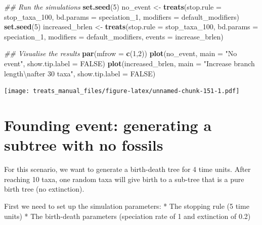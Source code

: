 \documentclass[
]{book}
\newenvironment{Shaded}{\begin{snugshade}}{\end{snugshade}}
\newcommand{\CharTok}[1]{\textcolor[rgb]{0.31,0.60,0.02}{#1}}
\newcommand{\CommentTok}[1]{\textcolor[rgb]{0.56,0.35,0.01}{\textit{#1}}}
\newcommand{\DataTypeTok}[1]{\textcolor[rgb]{0.13,0.29,0.53}{#1}}
\newcommand{\DecValTok}[1]{\textcolor[rgb]{0.00,0.00,0.81}{#1}}
\newcommand{\KeywordTok}[1]{\textcolor[rgb]{0.13,0.29,0.53}{\textbf{#1}}}
\newcommand{\NormalTok}[1]{#1}
\newcommand{\OtherTok}[1]{\textcolor[rgb]{0.56,0.35,0.01}{#1}}
\newcommand{\StringTok}[1]{\textcolor[rgb]{0.31,0.60,0.02}{#1}}
\begin{document}
\begin{Shaded}
\begin{Highlighting}[]
\CommentTok{\#\# Run the simulations}
\KeywordTok{set.seed}\NormalTok{(}\DecValTok{5}\NormalTok{)}
\NormalTok{no\_event \textless{}{-}}\StringTok{ }\KeywordTok{treats}\NormalTok{(}\DataTypeTok{stop.rule =}\NormalTok{ stop\_taxa\_}\DecValTok{100}\NormalTok{,}
                 \DataTypeTok{bd.params =}\NormalTok{ speciation\_}\DecValTok{1}\NormalTok{,}
                 \DataTypeTok{modifiers =}\NormalTok{ default\_modifiers)}
\KeywordTok{set.seed}\NormalTok{(}\DecValTok{5}\NormalTok{)}
\NormalTok{increased\_brlen \textless{}{-}}\StringTok{ }\KeywordTok{treats}\NormalTok{(}\DataTypeTok{stop.rule =}\NormalTok{ stop\_taxa\_}\DecValTok{100}\NormalTok{,}
                        \DataTypeTok{bd.params =}\NormalTok{ speciation\_}\DecValTok{1}\NormalTok{,}
                        \DataTypeTok{modifiers =}\NormalTok{ default\_modifiers,}
                        \DataTypeTok{events =}\NormalTok{ increase\_brlen)}

\CommentTok{\#\# Visualise the results}
\KeywordTok{par}\NormalTok{(}\DataTypeTok{mfrow =} \KeywordTok{c}\NormalTok{(}\DecValTok{1}\NormalTok{,}\DecValTok{2}\NormalTok{))}
\KeywordTok{plot}\NormalTok{(no\_event, }\DataTypeTok{main =} \StringTok{"No event"}\NormalTok{, }\DataTypeTok{show.tip.label =} \OtherTok{FALSE}\NormalTok{)}
\KeywordTok{plot}\NormalTok{(increased\_brlen, }\DataTypeTok{main =} \StringTok{"Increase branch length}\CharTok{\textbackslash{}n}\StringTok{after 30 taxa"}\NormalTok{,}
    \DataTypeTok{show.tip.label =} \OtherTok{FALSE}\NormalTok{)}
\end{Highlighting}
\end{Shaded}

\texttt{[image: treats\_manual\_files/figure-latex/unnamed-chunk-151-1.pdf]}

\hypertarget{EG_founding_purebirth}{%
\section{Founding event: generating a subtree with no fossils}\label{EG_founding_purebirth}}

For this scenario, we want to generate a birth-death tree for 4 time units.
After reaching 10 taxa, one random taxa will give birth to a sub-tree that is a pure birth tree (no extinction).

First we need to set up the simulation parameters:
* The stopping rule (5 time units)
* The birth-death parameters (speciation rate of 1 and extinction of 0.2)
\end{document}
